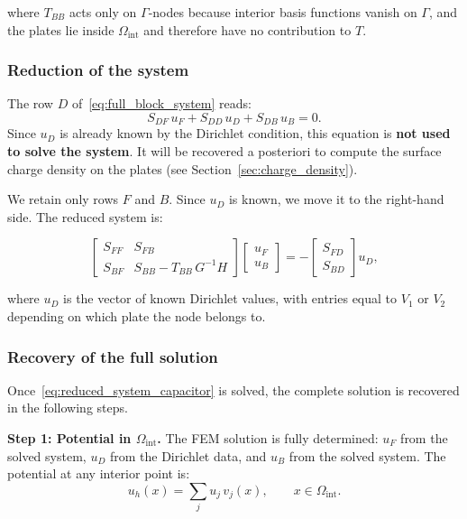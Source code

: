 \documentclass[11pt,onecolumn]{article}
\begin{document}
where $T_{BB}$ acts only on $\Gamma$-nodes because interior basis functions vanish on $\Gamma$, 
and the plates lie inside $\Omega_{\text{int}}$ and therefore have no contribution to $T$. 

\subsubsection{Reduction of the system}

The row $D$ of~\eqref{eq:full_block_system} reads:
\begin{equation}
S_{DF}\, u_F + S_{DD}\, u_D + S_{DB}\, u_B = 0.
\label{eq:row_D}
\end{equation}
Since $u_D$ is already known by the Dirichlet condition, this equation is \textbf{not used to 
solve the system}. It will be recovered a posteriori to compute the surface charge density on 
the plates (see Section~\ref{sec:charge_density}).

We retain only rows $F$ and $B$. Since $u_D$ is known, we move it to the right-hand side. 
The reduced system is:

\begin{equation}
\begin{bmatrix}
S_{FF} & S_{FB} \\
S_{BF} & S_{BB} - T_{BB}\,G^{-1}H
\end{bmatrix}
\begin{bmatrix}
u_F \\ u_B
\end{bmatrix}
=
-\begin{bmatrix}
S_{FD} \\ S_{BD}
\end{bmatrix}
u_D,
\label{eq:reduced_system_capacitor}
\end{equation}

where $u_D$ is the vector of known Dirichlet values, with entries equal to $V_1$ or $V_2$ 
depending on which plate the node belongs to.

\subsubsection{Recovery of the full solution}\label{subsec:recovery_solution}

Once~\eqref{eq:reduced_system_capacitor} is solved, the complete solution is recovered in the 
following steps.

\textbf{Step 1: Potential in $\Omega_{\text{int}}$.}
The FEM solution is fully determined: $u_F$ from the solved system, $u_D$ from the Dirichlet 
data, and $u_B$ from the solved system. The potential at any interior point is:
\begin{equation}
u_h(x) = \sum_j u_j\, v_j(x), \qquad x \in \Omega_{\text{int}}.
\end{equation}
\end{document}
